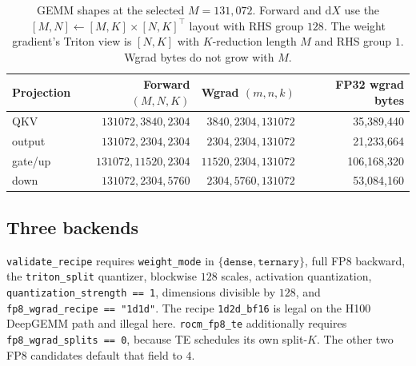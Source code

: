 \documentclass[11pt]{article}
\DeclareRobustCommand{\code}[1]{\texttt{#1}}
\begin{document}
\begin{table}[t]
\centering
\caption{GEMM shapes at the selected \(M=131{,}072\). Forward and
\(\mathrm{d}X\) use the \([M,N]\leftarrow[M,K]\times[N,K]^{\top}\) layout
with RHS group \(128\). The weight gradient's Triton view is \([N,K]\) with
\(K\)-reduction length \(M\) and RHS group \(1\). Wgrad bytes do not grow
with \(M\).}
\label{tab:shapes}
\begin{tabular}{@{}lrrr@{}}
\toprule
Projection & Forward \((M,N,K)\) & Wgrad \((m,n,k)\) & FP32 wgrad bytes \\
\midrule
QKV & \(131072,3840,2304\) & \(3840,2304,131072\) & 35{,}389{,}440 \\
output & \(131072,2304,2304\) & \(2304,2304,131072\) & 21{,}233{,}664 \\
gate/up & \(131072,11520,2304\) & \(11520,2304,131072\) & 106{,}168{,}320 \\
down & \(131072,2304,5760\) & \(2304,5760,131072\) & 53{,}084{,}160 \\
\bottomrule
\end{tabular}
\end{table}

\subsection{Three backends}

\code{validate\_recipe} requires \code{weight\_mode} in
\(\{\code{dense},\code{ternary}\}\), full FP8 backward, the
\code{triton\_split} quantizer, blockwise \(128\) scales, activation
quantization, \code{quantization\_strength == 1}, dimensions divisible by
\(128\), and \code{fp8\_wgrad\_recipe == "1d1d"}. The recipe
\code{1d2d\_bf16} is legal on the H100 DeepGEMM path and illegal here.
\code{rocm\_fp8\_te} additionally requires \code{fp8\_wgrad\_splits == 0},
because TE schedules its own split-\(K\). The other two FP8 candidates
default that field to \(4\).
\end{document}

